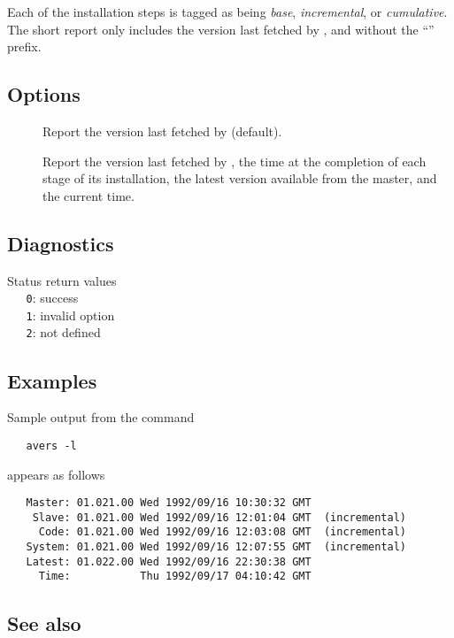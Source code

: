 \noindent
Each of the installation steps is tagged as being {\em base},
{\em incremental}, or {\em cumulative}.  The short report only includes the
version last fetched by , and without the ``''
prefix.

\subsection*{Options}

\begin{description}
\item[]
   Report the version last fetched by  (default).

\item[]
   Report the version last fetched by , the time at the
   completion of each stage of its installation, the latest version available
   from the master, and the current time.
\end{description}

\subsection*{Diagnostics}

Status return values
\\ \verb+   0+: success
\\ \verb+   1+: invalid option
\\ \verb+   2+:  not defined

\subsection*{Examples}

Sample output from the command

\begin{verbatim}
   avers -l
\end{verbatim}

\noindent
appears as follows

\begin{verbatim}
   Master: 01.021.00 Wed 1992/09/16 10:30:32 GMT
    Slave: 01.021.00 Wed 1992/09/16 12:01:04 GMT  (incremental)
     Code: 01.021.00 Wed 1992/09/16 12:03:08 GMT  (incremental)
   System: 01.021.00 Wed 1992/09/16 12:07:55 GMT  (incremental)
   Latest: 01.022.00 Wed 1992/09/16 22:30:38 GMT
     Time:           Thu 1992/09/17 04:10:42 GMT
\end{verbatim}

\subsection*{See also}


